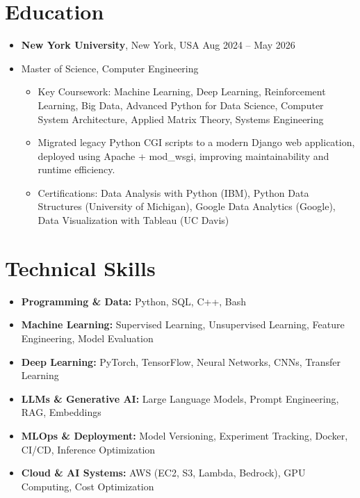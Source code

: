 \documentclass[letterpaper,10pt]{article}
\begin{document}
\section*{Education}
\begin{itemize}
    \item \textbf{New York University}, New York, USA \hfill Aug 2024 – May 2026
    \item Master of Science, Computer Engineering
    \begin{itemize} %
        \item Key Coursework: Machine Learning, Deep Learning, Reinforcement Learning, Big Data, Advanced Python for Data Science, Computer System Architecture, Applied Matrix Theory, Systems Engineering
        \item Migrated legacy Python CGI scripts to a modern Django web application, deployed using Apache + mod\_wsgi, improving maintainability and runtime efficiency.
        \item Certifications: Data Analysis with Python (IBM), Python Data Structures (University of Michigan), Google Data Analytics (Google), Data Visualization with Tableau (UC Davis)
    \end{itemize}
\end{itemize}

\section*{Technical Skills}
\begin{itemize}[leftmargin=0.5in] %
    \item \textbf{Programming \& Data:} Python, SQL, C++, Bash
    \item \textbf{Machine Learning:} Supervised Learning, Unsupervised Learning, Feature Engineering, Model Evaluation
    \item \textbf{Deep Learning:} PyTorch, TensorFlow, Neural Networks, CNNs, Transfer Learning
    \item \textbf{LLMs \& Generative AI:} Large Language Models, Prompt Engineering, RAG, Embeddings
    \item \textbf{MLOps \& Deployment:} Model Versioning, Experiment Tracking, Docker, CI/CD, Inference Optimization
    \item \textbf{Cloud \& AI Systems:} AWS (EC2, S3, Lambda, Bedrock), GPU Computing, Cost Optimization
\end{itemize}
\end{document}
